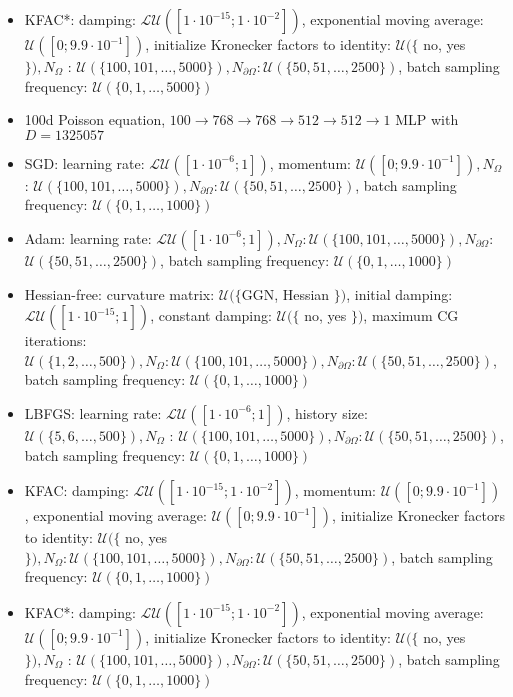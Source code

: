 \documentclass[10pt]{article}
\begin{document}
\begin{itemize}
  \item KFAC*: damping: $\mathcal{L U}\left(\left[1 \cdot 10^{-15} ; 1 \cdot 10^{-2}\right]\right)$, exponential moving average: $\mathcal{U}\left(\left[0 ; 9.9 \cdot 10^{-1}\right]\right)$, initialize Kronecker factors to identity: $\mathcal{U}(\{$ no, yes $\}), N_{\Omega}$ : $\mathcal{U}(\{100,101, \ldots, 5000\}), N_{\partial \Omega}: \mathcal{U}(\{50,51, \ldots, 2500\})$, batch sampling frequency: $\mathcal{U}(\{0,1, \ldots, 5000\})$
  \item 100d Poisson equation, $100 \rightarrow 768 \rightarrow 768 \rightarrow 512 \rightarrow 512 \rightarrow 1$ MLP with $D=1325057$
  \item SGD: learning rate: $\mathcal{L U}\left(\left[1 \cdot 10^{-6} ; 1\right]\right)$, momentum: $\mathcal{U}\left(\left[0 ; 9.9 \cdot 10^{-1}\right]\right), N_{\Omega}$ : $\mathcal{U}(\{100,101, \ldots, 5000\}), N_{\partial \Omega}: \mathcal{U}(\{50,51, \ldots, 2500\})$, batch sampling frequency: $\mathcal{U}(\{0,1, \ldots, 1000\})$
  \item Adam: learning rate: $\mathcal{L U}\left(\left[1 \cdot 10^{-6} ; 1\right]\right), N_{\Omega}: \mathcal{U}(\{100,101, \ldots, 5000\}), N_{\partial \Omega}:$ $\mathcal{U}(\{50,51, \ldots, 2500\})$, batch sampling frequency: $\mathcal{U}(\{0,1, \ldots, 1000\})$
  \item Hessian-free: curvature matrix: $\mathcal{U}(\{\mathrm{GGN}$, Hessian $\})$, initial damping: $\mathcal{L U}\left(\left[1 \cdot 10^{-15} ; 1\right]\right)$, constant damping: $\mathcal{U}(\{$ no, yes $\})$, maximum CG iterations: $\mathcal{U}(\{1,2, \ldots, 500\}), N_{\Omega}: \mathcal{U}(\{100,101, \ldots, 5000\}), N_{\partial \Omega}: \mathcal{U}(\{50,51, \ldots, 2500\})$, batch sampling frequency: $\mathcal{U}(\{0,1, \ldots, 1000\})$
  \item LBFGS: learning rate: $\mathcal{L U}\left(\left[1 \cdot 10^{-6} ; 1\right]\right)$, history size: $\mathcal{U}(\{5,6, \ldots, 500\}), N_{\Omega}$ : $\mathcal{U}(\{100,101, \ldots, 5000\}), N_{\partial \Omega}: \mathcal{U}(\{50,51, \ldots, 2500\})$, batch sampling frequency: $\mathcal{U}(\{0,1, \ldots, 1000\})$
  \item KFAC: damping: $\mathcal{L U}\left(\left[1 \cdot 10^{-15} ; 1 \cdot 10^{-2}\right]\right)$, momentum: $\mathcal{U}\left(\left[0 ; 9.9 \cdot 10^{-1}\right]\right)$, exponential moving average: $\mathcal{U}\left(\left[0 ; 9.9 \cdot 10^{-1}\right]\right)$, initialize Kronecker factors to identity: $\mathcal{U}(\{$ no, yes $\}), N_{\Omega}: \mathcal{U}(\{100,101, \ldots, 5000\}), N_{\partial \Omega}: \mathcal{U}(\{50,51, \ldots, 2500\})$, batch sampling frequency: $\mathcal{U}(\{0,1, \ldots, 1000\})$
  \item KFAC*: damping: $\mathcal{L U}\left(\left[1 \cdot 10^{-15} ; 1 \cdot 10^{-2}\right]\right)$, exponential moving average: $\mathcal{U}\left(\left[0 ; 9.9 \cdot 10^{-1}\right]\right)$, initialize Kronecker factors to identity: $\mathcal{U}(\{$ no, yes $\}), N_{\Omega}$ : $\mathcal{U}(\{100,101, \ldots, 5000\}), N_{\partial \Omega}: \mathcal{U}(\{50,51, \ldots, 2500\})$, batch sampling frequency: $\mathcal{U}(\{0,1, \ldots, 1000\})$
\end{itemize}
\end{document}
